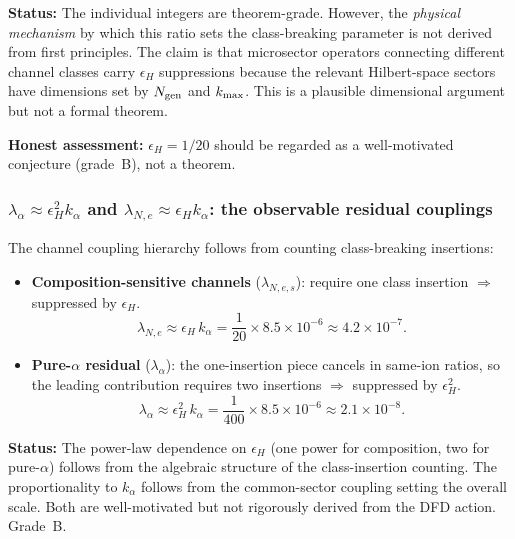 \documentclass[twocolumn,showpacs,preprintnumbers,amsmath,amssymb,prd]{revtex4-2}
\newcommand{\kalpha}{k_\alpha}
\begin{document}
\textbf{Status:} The individual integers are theorem-grade.
However, the \emph{physical mechanism} by which this ratio sets the
class-breaking parameter is not derived from first principles.
The claim is that microsector operators connecting different
channel classes carry $\epsilon_H$ suppressions because the
relevant Hilbert-space sectors have dimensions set by $N_{\rm gen}$
and $k_{\rm max}$.  This is a plausible dimensional argument but
not a formal theorem.

\textbf{Honest assessment:} $\epsilon_H = 1/20$ should be regarded
as a well-motivated conjecture (grade~B), not a theorem.

\subsubsection{$\lambda_\alpha \approx \epsilon_H^2 \kalpha$ and
$\lambda_{N,e} \approx \epsilon_H \kalpha$: the observable
residual couplings}\label{sec:lambda-deriv}

The channel coupling hierarchy follows from counting class-breaking
insertions:
\begin{itemize}
\item \textbf{Composition-sensitive channels} ($\lambda_{N,e,s}$):
  require one class insertion $\Rightarrow$ suppressed by $\epsilon_H$.
  \begin{equation}\label{eq:lambda-comp}
  \lambda_{N,e} \approx \epsilon_H \, \kalpha
  = \frac{1}{20} \times 8.5 \times 10^{-6}
  \approx 4.2 \times 10^{-7}.
  \end{equation}

\item \textbf{Pure-$\alpha$ residual} ($\lambda_\alpha$):
  the one-insertion piece cancels in same-ion ratios, so the leading
  contribution requires two insertions $\Rightarrow$ suppressed by
  $\epsilon_H^2$.
  \begin{equation}\label{eq:lambda-alpha}
  \lambda_\alpha \approx \epsilon_H^2 \, \kalpha
  = \frac{1}{400} \times 8.5 \times 10^{-6}
  \approx 2.1 \times 10^{-8}.
  \end{equation}
\end{itemize}

\textbf{Status:} The power-law dependence on $\epsilon_H$ (one
power for composition, two for pure-$\alpha$) follows from the
algebraic structure of the class-insertion counting.  The
proportionality to $\kalpha$ follows from the common-sector
coupling setting the overall scale.  Both are well-motivated but
not rigorously derived from the DFD action.  Grade~B.
\end{document}
